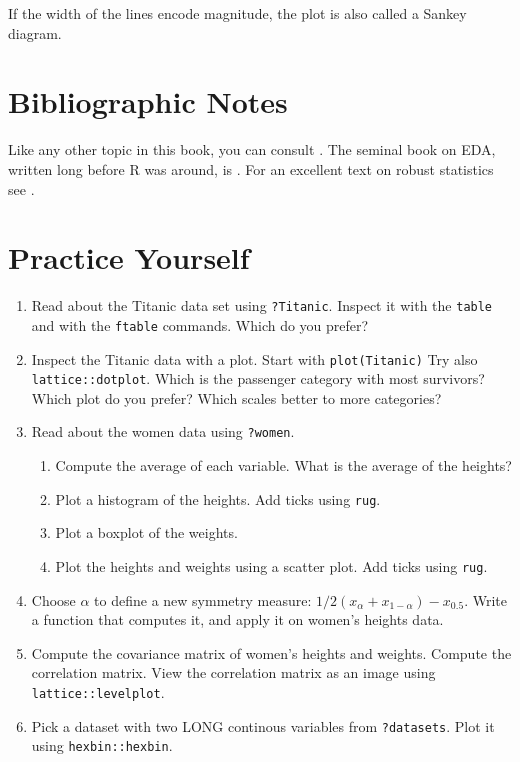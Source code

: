 \documentclass[]{book}
\providecommand{\tightlist}{%
  \setlength{\itemsep}{0pt}\setlength{\parskip}{0pt}}
\theoremstyle{definition}
\theoremstyle{definition}
\theoremstyle{definition}
\theoremstyle{remark}
\let\BeginKnitrBlock\begin \let\EndKnitrBlock\end
\begin{document}
\BeginKnitrBlock{remark}
{}If the width of the lines encode magnitude, the plot is also called a Sankey diagram.
\EndKnitrBlock{remark}

\hypertarget{bibliographic-notes-3}{%
\section{Bibliographic Notes}\label{bibliographic-notes-3}}

Like any other topic in this book, you can consult \citet{venables2013modern}.
The seminal book on EDA, written long before R was around, is \citet{tukey1977exploratory}.
For an excellent text on robust statistics see \citet{wilcox2011introduction}.

\hypertarget{practice-yourself-2}{%
\section{Practice Yourself}\label{practice-yourself-2}}

\begin{enumerate}
\def\labelenumi{\arabic{enumi}.}
\item
  Read about the Titanic data set using \texttt{?Titanic}. Inspect it with the \texttt{table} and with the \texttt{ftable} commands. Which do you prefer?
\item
  Inspect the Titanic data with a plot. Start with \texttt{plot(Titanic)} Try also \texttt{lattice::dotplot}. Which is the passenger category with most survivors? Which plot do you prefer? Which scales better to more categories?
\item
  Read about the women data using \texttt{?women}.

  \begin{enumerate}
  \def\labelenumii{\arabic{enumii}.}
  \tightlist
  \item
    Compute the average of each variable. What is the average of the heights?
  \item
    Plot a histogram of the heights. Add ticks using \texttt{rug}.
  \item
    Plot a boxplot of the weights.
  \item
    Plot the heights and weights using a scatter plot. Add ticks using \texttt{rug}.
  \end{enumerate}
\item
  Choose \(\alpha\) to define a new symmetry measure: \(1/2(x_\alpha+x_{1-\alpha})-x_{0.5}\).
  Write a function that computes it, and apply it on women's heights data.
\item
  Compute the covariance matrix of women's heights and weights. Compute the correlation matrix. View the correlation matrix as an image using \texttt{lattice::levelplot}.
\item
  Pick a dataset with two LONG continous variables from \texttt{?datasets}. Plot it using \texttt{hexbin::hexbin}.
\end{enumerate}
\end{document}
